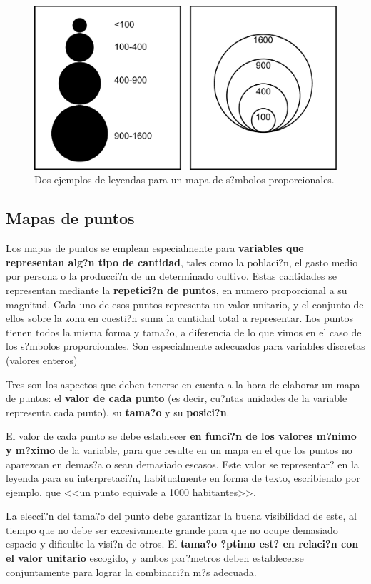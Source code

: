 \begin{figure}[!hbt]
\centering
\includegraphics[width=.65\columnwidth]{../es/Visualizacion/EjemplosLeyendaSimbolosProporcionales.pdf}
\caption{\small Dos ejemplos de leyendas para un mapa de s?mbolos proporcionales.}
\label{Fig:EjemplosLeyendaSimbolosProporcionales} 
\end{figure}


\subsection{Mapas de puntos}

Los mapas de puntos se emplean especialmente para \textbf{variables que representan alg?n tipo de cantidad}, tales como la poblaci?n, el gasto medio por persona o la producci?n de un determinado cultivo. Estas cantidades se representan mediante la \textbf{repetici?n de puntos}, en numero proporcional a su magnitud. Cada uno de esos puntos representa un valor unitario, y el conjunto de ellos sobre la zona en cuesti?n suma la cantidad total a representar. Los puntos tienen todos la misma forma y tama?o, a diferencia de lo que vimos en el caso de los s?mbolos proporcionales. Son especialmente adecuados para variables discretas (valores enteros)

Tres son los aspectos que deben tenerse en cuenta a la hora de elaborar un mapa de puntos: el \textbf{valor de cada punto} (es decir, cu?ntas unidades de la variable representa cada punto), su \textbf{tama?o} y su \textbf{posici?n}.

El valor de cada punto se debe establecer \textbf{en funci?n de los valores m?nimo y m?ximo} de la variable, para que resulte en un mapa en el que los puntos no aparezcan en demas?a o sean demasiado escasos. Este valor se representar? en la leyenda para su interpretaci?n, habitualmente en forma de texto, escribiendo por ejemplo, que <<un punto equivale a 1000 habitantes>>.

La elecci?n del tama?o del punto debe garantizar la buena visibilidad de este, al tiempo que no debe ser excesivamente grande para que no ocupe demasiado espacio y dificulte la visi?n de otros. El \textbf{tama?o ?ptimo est? en relaci?n con el valor unitario} escogido, y ambos par?metros deben establecerse conjuntamente para lograr la combinaci?n m?s adecuada.

